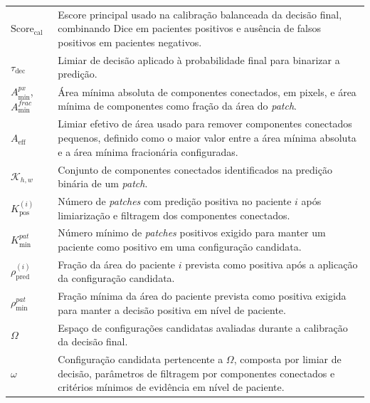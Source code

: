 \begin{longtable}{p{3.0cm}p{12.0cm}}
  $\mathrm{Score}_{\mathrm{cal}}$ &
  Escore principal usado na calibração balanceada da decisão final, combinando
  Dice em pacientes positivos e ausência de falsos positivos em pacientes
  negativos.\\

  $\tau_{\mathrm{dec}}$ &
  Limiar de decisão aplicado à probabilidade final para binarizar a predição.\\

  $A_{\min}^{px}$, $A_{\min}^{frac}$ &
  Área mínima absoluta de componentes conectados, em pixels, e área mínima de
  componentes como fração da área do \textit{patch}.\\

  $A_{\mathrm{eff}}$ &
  Limiar efetivo de área usado para remover componentes conectados pequenos,
  definido como o maior valor entre a área mínima absoluta e a área mínima
  fracionária configuradas.\\

  $\mathcal{K}_{h,w}$ &
  Conjunto de componentes conectados identificados na predição binária de um
  \textit{patch}.\\

  $K_{\mathrm{pos}}^{(i)}$ &
  Número de \textit{patches} com predição positiva no paciente $i$ após
  limiarização e filtragem dos componentes conectados.\\

  $K_{\min}^{pat}$ &
  Número mínimo de \textit{patches} positivos exigido para manter um paciente
  como positivo em uma configuração candidata.\\

  $\rho_{\mathrm{pred}}^{(i)}$ &
  Fração da área do paciente $i$ prevista como positiva após a aplicação da
  configuração candidata.\\

  $\rho_{\min}^{pat}$ &
  Fração mínima da área do paciente prevista como positiva exigida para manter a
  decisão positiva em nível de paciente.\\

  $\Omega$ &
  Espaço de configurações candidatas avaliadas durante a calibração da decisão
  final.\\

  $\omega$ &
  Configuração candidata pertencente a $\Omega$, composta por limiar de decisão,
  parâmetros de filtragem por componentes conectados e critérios mínimos de
  evidência em nível de paciente.\\

\end{longtable}
\endgroup